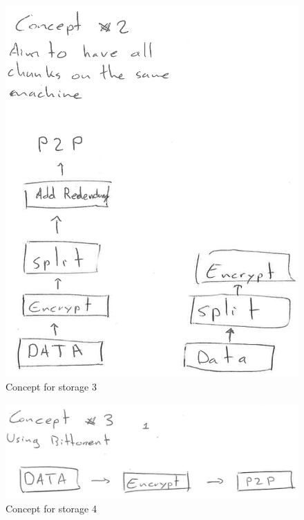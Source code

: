 \begin{figure}[htpb]
\centering
\begin{adjustbox}{center}
\includegraphics[scale=1]{annexes/concepts/oc-concept-storage-3.png}
\end{adjustbox}
\caption{Concept for storage 3
\label{fig:oc-concept-storage-3}} 
\end{figure}

\begin{figure}[htpb]
\centering
\begin{adjustbox}{center}
\includegraphics[scale=1]{annexes/concepts/oc-concept-storage-4.png}
\end{adjustbox}
\caption{Concept for storage 4
\label{fig:oc-concept-storage-4}} 
\end{figure}

